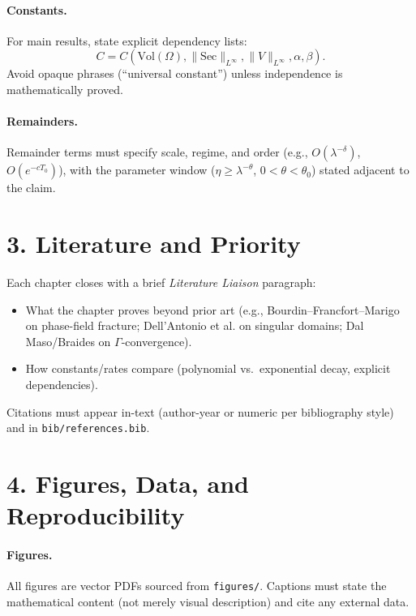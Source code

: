 \paragraph{Constants.}
For main results, state explicit dependency lists:
\[
C = C\!\left(\mathrm{Vol}(\Omega), \|\mathrm{Sec}\|_{L^\infty}, \|V\|_{L^\infty}, \alpha, \beta\right).
\]
Avoid opaque phrases (“universal constant”) unless independence is mathematically proved.

\paragraph{Remainders.}
Remainder terms must specify scale, regime, and order (e.g., $O(\lambda^{-\delta})$, $O(e^{-cT_0})$), with the parameter window ($\eta \ge \lambda^{-\theta}$, $0<\theta<\theta_0$) stated adjacent to the claim.

\section*{3. Literature and Priority}

Each chapter closes with a brief \emph{Literature Liaison} paragraph:
\begin{itemize}
  \item What the chapter proves beyond prior art (e.g., Bourdin–Francfort–Marigo on phase-field fracture; Dell’Antonio et al. on singular domains; Dal Maso/Braides on $\Gamma$-convergence).
  \item How constants/rates compare (polynomial vs.\ exponential decay, explicit dependencies).
\end{itemize}
Citations must appear in-text (author-year or numeric per bibliography style) and in \texttt{bib/references.bib}.

\section*{4. Figures, Data, and Reproducibility}

\paragraph{Figures.}
All figures are vector PDFs sourced from \texttt{figures/}. Captions must state the mathematical content (not merely visual description) and cite any external data.

